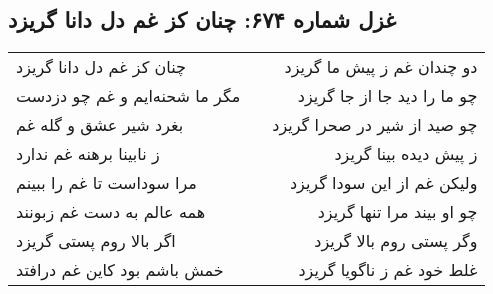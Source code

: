 \begin{center}
\section*{غزل شماره ۶۷۴: چنان کز غم دل دانا گریزد}
\label{sec:0674}
\begin{longtable}{l p{0.5cm} r}
چنان کز غم دل دانا گریزد
&&
دو چندان غم ز پیش ما گریزد
\\
مگر ما شحنه‌ایم و غم چو دزدست
&&
چو ما را دید جا از جا گریزد
\\
بغرد شیر عشق و گله غم
&&
چو صید از شیر در صحرا گریزد
\\
ز نابینا برهنه غم ندارد
&&
ز پیش دیده بینا گریزد
\\
مرا سوداست تا غم را ببینم
&&
ولیکن غم از این سودا گریزد
\\
همه عالم به دست غم زبونند
&&
چو او بیند مرا تنها گریزد
\\
اگر بالا روم پستی گریزد
&&
وگر پستی روم بالا گریزد
\\
خمش باشم بود کاین غم درافتد
&&
غلط خود غم ز ناگویا گریزد
\\
\end{longtable}
\end{center}

